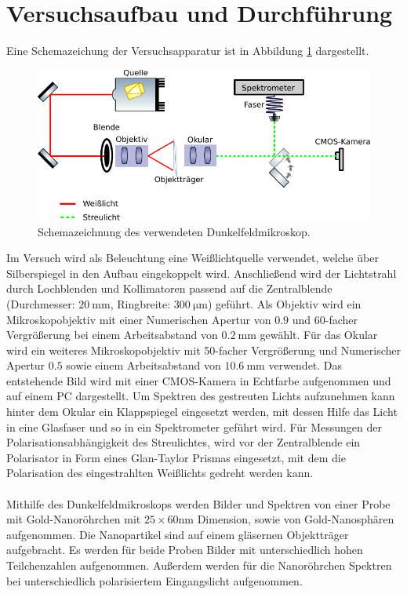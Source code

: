 \section{Versuchsaufbau und Durchführung}
Eine Schemazeichung der Versuchsapparatur ist in Abbildung \ref{fig:aufbau} dargestellt.
\begin{figure}[h]
  \includegraphics[width=\textwidth]{plots/dfm.PDF}
  \caption{Schemazeichnung des verwendeten Dunkelfeldmikroskop.}
  \label{fig:aufbau}
\end{figure}
Im Versuch wird als Beleuchtung eine Weißlichtquelle verwendet, welche über Silberspiegel in den Aufbau eingekoppelt wird. Anschließend wird der Lichtstrahl durch Lochblenden und Kollimatoren passend auf die Zentralblende (Durchmesser: $\SI{20}{\milli\meter}$, Ringbreite: $\SI{300}{\micro\meter}$) geführt. Als Objektiv wird ein Mikroskopobjektiv mit einer Numerischen Apertur von $0.9$ und 60-facher Vergrößerung bei einem Arbeitsabstand von $\SI{0.2}{\milli\meter}$ gewählt. Für das Okular wird ein weiteres Mikroskopobjektiv mit 50-facher Vergrößerung und Numerischer Apertur $0.5$ sowie einem Arbeitsabstand von $\SI{10.6}{\milli\meter}$ verwendet. Das entstehende Bild wird mit einer CMOS-Kamera in Echtfarbe aufgenommen und auf einem PC dargestellt. Um Spektren des gestreuten Lichts aufzunehmen kann hinter dem Okular ein Klappspiegel eingesetzt werden, mit dessen Hilfe das Licht in eine Glasfaser und so in ein Spektrometer geführt wird. Für Messungen der Polarisationsabhängigkeit des Streulichtes, wird vor der Zentralblende ein Polarisator in Form eines Glan-Taylor Prismas eingesetzt, mit dem die Polarisation des eingestrahlten Weißlichts gedreht werden kann.\\
\\
Mithilfe des Dunkelfeldmikroskops werden Bilder und Spektren von einer Probe mit Gold-Nanoröhrchen mit $25\times60 \si{\nano\meter}$ Dimension, sowie von Gold-Nanosphären aufgenommen. Die Nanopartikel sind auf einem gläsernen Objektträger aufgebracht. Es werden für beide Proben Bilder mit unterschiedlich hohen Teilchenzahlen aufgenommen. Außerdem werden für die Nanoröhrchen Spektren bei unterschiedlich polarisiertem Eingangslicht aufgenommen. \cite{anleitung}
%
%

